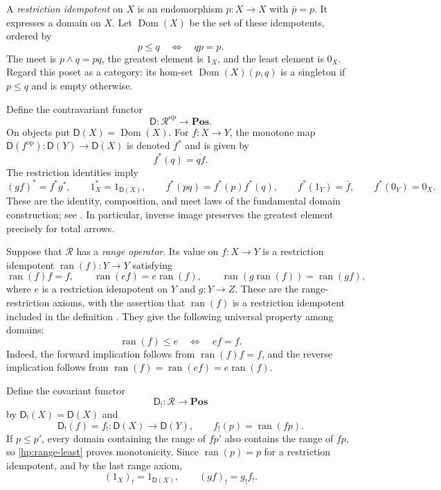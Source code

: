 \documentclass[11pt]{article}
\theoremstyle{definition}
\theoremstyle{remark}
\newcommand{\R}{\mathscr R}
\newcommand{\D}{\mathsf D}
\newcommand{\Dom}{\operatorname{Dom}}
\newcommand{\ran}{\operatorname{ran}}
\newcommand{\Pos}{\mathbf{Pos}}
\newcommand{\op}{\mathrm{op}}
\begin{document}
A \emph{restriction idempotent} on $X$ is an endomorphism $p:X\to X$
with $\bar p=p$. It expresses a domain on $X$. Let $\Dom(X)$ be the set
of these idempotents, ordered by
\[
 p\le q\quad\Longleftrightarrow\quad qp=p.
\]
The meet is $p\wedge q=pq$, the greatest element is $1_X$, and the
least element is $0_X$. Regard this poset as a category: its hom-set
$\Dom(X)(p,q)$ is a singleton if $p\le q$ and is empty otherwise.

Define the contravariant functor
\begin{equation}\label{hp:domain-functor}
 \D:\R^{\op}\longrightarrow\Pos.
\end{equation}
On objects put $\D(X)=\Dom(X)$. For $f:X\to Y$, the monotone map
$\D(f^{\op}):\D(Y)\to\D(X)$ is denoted $f^*$ and is given by
\[
 f^*(q)=\overline{qf}.
\]
The restriction identities imply
\begin{equation}\label{hp:pullback-laws}
 (gf)^*=f^*g^*,\qquad 1_X^*=1_{\D(X)},\qquad
 f^*(pq)=f^*(p)f^*(q),\qquad
 f^*(1_Y)=\bar f,\qquad f^*(0_Y)=0_X.
\end{equation}
These are the identity, composition, and meet laws of the fundamental
domain construction; see \cite[Proposition~3.1]{CockettGarner}.
In particular, inverse image preserves the greatest element precisely
for total arrows.

Suppose that $\R$ has a \emph{range operator}. Its value on $f:X\to Y$
is a restriction idempotent $\ran(f):Y\to Y$ satisfying
\begin{equation}\label{hp:range-axioms}
 \ran(f)f=f,\qquad
 \ran(ef)=e\ran(f),\qquad
 \ran(g\ran(f))=\ran(gf),
\end{equation}
where $e$ is a restriction idempotent on $Y$ and $g:Y\to Z$.
These are the range-restriction axioms, with the assertion that
$\ran(f)$ is a restriction idempotent included in the definition
\cite[Section~8]{CockettGarner}. They give the following universal
property among domains:
\begin{equation}\label{hp:range-least}
 \ran(f)\le e\quad\Longleftrightarrow\quad ef=f.
\end{equation}
Indeed, the forward implication follows from $\ran(f)f=f$, and the
reverse implication follows from $\ran(f)=\ran(ef)=e\ran(f)$.

Define the covariant functor
\[
 \D_!:\R\longrightarrow\Pos
\]
by $\D_!(X)=\D(X)$ and
\[
 \D_!(f)=f_!: \D(X)\longrightarrow\D(Y),\qquad
 f_!(p)=\ran(fp).
\]
If $p\le p'$, every domain containing the range of $fp'$ also contains
the range of $fp$, so \eqref{hp:range-least} proves monotonicity.
Since $\ran(p)=p$ for a restriction idempotent, and by the last range
axiom,
\begin{equation}\label{hp:image-functor}
 (1_X)_!=1_{\D(X)},\qquad (gf)_!=g_!f_!.
\end{equation}
\end{document}
